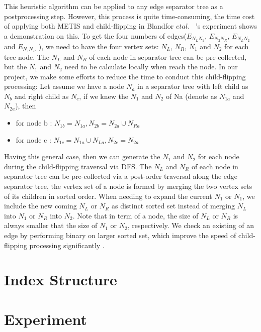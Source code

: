 \documentclass[12pt,glossary]{dalthesis}
\begin{document}
This heuristic algorithm can be applied to any edge separator tree as a postprocessing
step. However, this process is quite time-consuming, the time cost of applying both METIS and child-flipping in Blandfor $et al.$ ~\cite{compact-representation}'s experiment shows a demonstration on this. To get the four numbers of edges($E_{N_{L}N_{1}}$, $E_{N_{2}N_{R}}$, $E_{N_{L}N_{2}}$ and $E_{N_{1}N_{R}}$ ), we need to have the four vertex sets: $N_{L}$, $N_{R}$, $N_{1}$ and $N_{2}$ for each tree node. The $N_{L}$ and $N_{R}$ of each node in separator tree can be pre-collected, but the $N_{1}$ and $N_{2}$ need to be calculate locally when reach the node. In our project, we make some efforts to reduce the time to conduct this child-flipping processing: Let assume we have a node $N_{a}$ in a separator tree with left child as $N_{b}$ and right child as $N_{c}$, if we knew the $N_{1}$ and $N_{2}$ of Na (denote as $N_{1a}$ and $N_{2a}$), then

\begin{itemize}[noitemsep]
\item for node b : $ N_{1b} = N_{1a}, N_{2b} = N_{2a} \cup N_{Ra}$
\item for node c : $ N_{1c} = N_{1a} \cup N_{La}, N_{2c} = N_{2a}$ 
\end{itemize}

Having this general case, then we can generate the $N_{1}$ and $N_{2}$ for each node during the child-flipping traversal via DFS. The $N_{L}$ and $N_{R}$ of each node in separator tree can be pre-collected via a post-order traversal along the edge separator tree, the vertex set of a node is formed by merging the two vertex sets of its children in sorted order. When needing to expand the current $N_{1}$ or $N_{1}$, we include the new coming $N_{L}$ or $N_{R}$ as distinct sorted set instead of merging $N_{L}$ into $N_{1}$ or $N_{R}$ into $N_{2}$. Note that in term of a node, the size of $N_{L}$ or $N_{R}$ is always smaller that the size of $N_{1}$ or $N_{2}$, respectively. We check an existing of an edge by performing binary on larger sorted set, which improve the speed of child-flipping processing significantly .

\chapter{Index Structure}


\chapter{Experiment}
\end{document}

